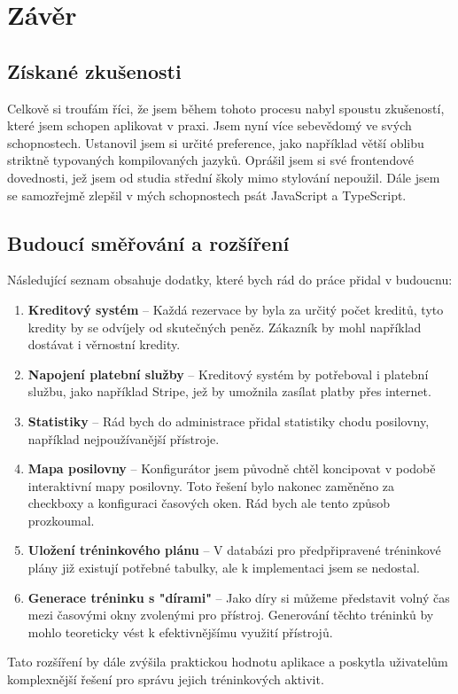 \chapter{Závěr}

\section{Získané zkušenosti}

Celkově si troufám říci, že jsem během tohoto procesu nabyl spoustu zkušeností, které jsem schopen aplikovat v praxi. Jsem nyní více sebevědomý ve svých schopnostech. Ustanovil jsem si určité preference, jako například větší oblibu striktně typovaných kompilovaných jazyků. Oprášil jsem si své frontendové dovednosti, jež jsem od studia střední školy mimo stylování nepoužil. Dále jsem se samozřejmě zlepšil v mých schopnostech psát JavaScript a TypeScript.

\section{Budoucí směřování a rozšíření}

Následující seznam obsahuje dodatky, které bych rád do práce přidal v budoucnu:

\begin{enumerate}
\item \textbf{Kreditový systém} – Každá rezervace by byla za určitý počet kreditů, tyto kredity by se odvíjely od skutečných peněz. Zákazník by mohl například dostávat i věrnostní kredity.
\item \textbf{Napojení platební služby} – Kreditový systém by potřeboval i platební službu, jako například Stripe, jež by umožnila zasílat platby přes internet.
\item \textbf{Statistiky} – Rád bych do administrace přidal statistiky chodu posilovny, například nejpoužívanější přístroje.
\item \textbf{Mapa posilovny} – Konfigurátor jsem původně chtěl koncipovat v podobě interaktivní mapy posilovny. Toto řešení bylo nakonec zaměněno za checkboxy a konfiguraci časových oken. Rád bych ale tento způsob prozkoumal.
\item \textbf{Uložení tréninkového plánu} – V databázi pro předpřipravené tréninkové plány již existují potřebné tabulky, ale k implementaci jsem se nedostal.
\item \textbf{Generace tréninku s "dírami"} – Jako díry si můžeme představit volný čas mezi časovými okny zvolenými pro přístroj. Generování těchto tréninků by mohlo teoreticky vést k efektivnějšímu využití přístrojů.
\end{enumerate}

Tato rozšíření by dále zvýšila praktickou hodnotu aplikace a poskytla uživatelům komplexnější řešení pro správu jejich tréninkových aktivit.
\endinput
